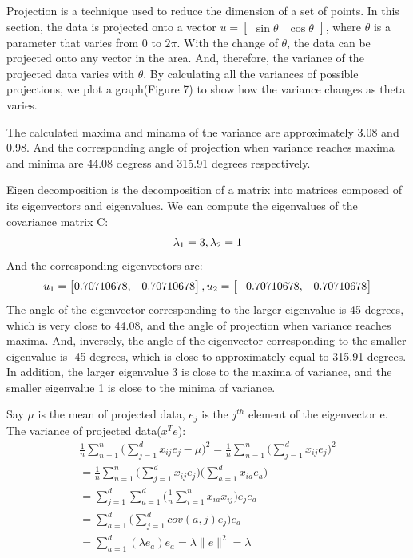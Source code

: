 \documentclass[10pt]{article}
\begin{document}
Projection is a technique used to reduce the dimension of a set of points. In this section, the data is projected onto a vector $u=\begin{bmatrix}\sin  \theta & \cos\theta  \end{bmatrix}$, where $\theta$ is a parameter that varies from 0 to $2\pi$. With the change of $\theta$, the data can be projected onto any vector in the area. And, therefore, the variance of the projected data varies with $\theta$. By calculating all the variances of possible projections, we plot a graph(Figure 7) to show how the variance changes as theta varies.

The calculated maxima and minama of the variance are approximately 3.08 and 0.98. And the corresponding angle of projection when variance reaches maxima and minima are 44.08 degress and 315.91 degrees respectively.

Eigen decomposition is the decomposition of a matrix into matrices composed of its eigenvectors and eigenvalues. We can compute the eigenvalues of the covariance matrix C: 
\begin{equation}
    \centering
     \lambda_1 = 3, \lambda_2 = 1
    \centering
\end{equation}
And the corresponding eigenvectors are:
\begin{equation}
    \centering
     u_1=\begin{bmatrix}0.70710678 ,& 0.70710678 \end{bmatrix},
     u_2=\begin{bmatrix}-0.70710678 ,& 0.70710678 \end{bmatrix}
    \centering
\end{equation}
The angle of the eigenvector corresponding to the larger eigenvalue is 45 degrees, which is very close to 44.08, and the angle of projection when variance reaches maxima. And, inversely, the angle of the eigenvector corresponding to the smaller eigenvalue is -45 degrees, which is close to approximately equal to 315.91 degrees. In addition, the larger eigenvalue 3 is close to the maxima of variance, and the smaller eigenvalue 1 is close to the minima of variance. 

Say $\mu$ is the mean of projected data, $e_j$ is the $j^{th}$ element of the eigenvector e. The variance of projected data($x^Te$):
\begin{equation}
\begin{aligned}
      \frac{1}{n}\sum_{n=1}^n\big(\sum_{j=1}^d x_{ij}e_j-\mu\big)^2 =  \frac{1}{n}\sum_{n=1}^n\big(\sum_{j=1}^d x_{ij}e_j\big)^2\\
      = \frac{1}{n}\sum_{n=1}^n\big(\sum_{j=1}^d x_{ij}e_j\big)\big(\sum_{a=1}^d x_{ia}e_a\big)\\
      = \sum_{j=1}^d  \sum_{a=1}^d  \big( \frac{1}{n} \sum_{i=1}^n x_{ia}x_{ij}\big)e_je_a\\
      =\sum_{a=1}^d \big( \sum_{j=1}^dcov(a,j)e_j\big)e_a \\
      =\sum_{a=1}^d (\lambda e_a)e_a = \lambda \parallel e \parallel ^2 = \lambda
\end{aligned}
\end{equation}
\end{document}
